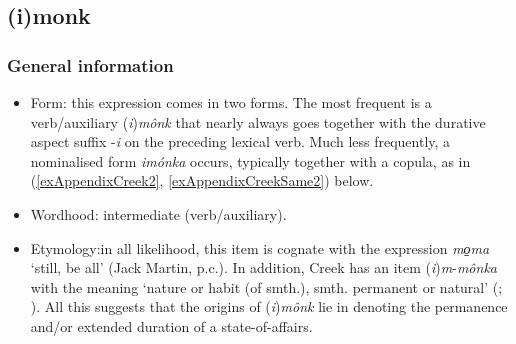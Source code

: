 \subsection{(i)monk}
\subsubsection{General information}
\begin{itemize}
\sloppy
\item Form: this expression comes in two forms. The most frequent is a verb\slash auxiliary \mbox{(\textit{i})\textit{mônk}} that nearly always goes together with the durative aspect suffix \mbox{-\textit{i}} on the preceding lexical verb. Much less frequently, a nominalised form \textit{imónka} occurs, typically together with a copula, as in (\ref{exAppendixCreek2}, \ref{exAppendixCreekSame2}) below. 
\item Wordhood: intermediate (verb/auxiliary).
\item Etymology:\quad in all likelihood, this item is cognate with the  expression \textit{mo̠ma} \lq still, be all' (Jack Martin, p.c.). In addition, Creek has an item (\textit{i})\textit{m}-\textit{mônka} with the meaning \lq nature or habit (of smth.), smth. permanent or natural' (\cite[307 fn4]{Martin2011}; \cite[25]{MartinMcKaneMauldin2000}). All this suggests that the origins of \mbox{(\textit{i})\textit{mônk}} lie in denoting the permanence and/or extended duration of a state-of-affairs.
\end{itemize}

